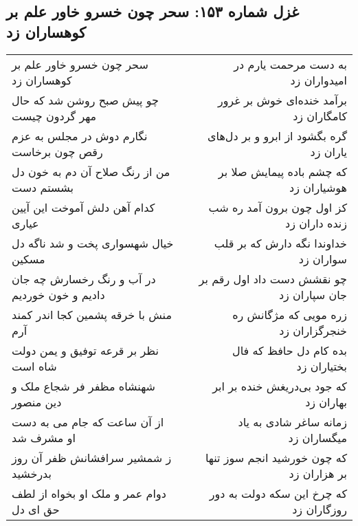\begin{center}
\section*{غزل شماره ۱۵۳: سحر چون خسرو خاور علم بر کوهساران زد}
\label{sec:sh153}
\begin{longtable}{l p{0.5cm} r}
سحر چون خسرو خاور علم بر کوهساران زد
&&
به دست مرحمت یارم در امیدواران زد
\\
چو پیش صبح روشن شد که حال مهر گردون چیست
&&
برآمد خنده‌ای خوش بر غرور کامگاران زد
\\
نگارم دوش در مجلس به عزم رقص چون برخاست
&&
گره بگشود از ابرو و بر دل‌های یاران زد
\\
من از رنگ صلاح آن دم به خون دل بشستم دست
&&
که چشم باده پیمایش صلا بر هوشیاران زد
\\
کدام آهن دلش آموخت این آیین عیاری
&&
کز اول چون برون آمد ره شب زنده داران زد
\\
خیال شهسواری پخت و شد ناگه دل مسکین
&&
خداوندا نگه دارش که بر قلب سواران زد
\\
در آب و رنگ رخسارش چه جان دادیم و خون خوردیم
&&
چو نقشش دست داد اول رقم بر جان سپاران زد
\\
منش با خرقه پشمین کجا اندر کمند آرم
&&
زره مویی که مژگانش ره خنجرگزاران زد
\\
نظر بر قرعه توفیق و یمن دولت شاه است
&&
بده کام دل حافظ که فال بختیاران زد
\\
شهنشاه مظفر فر شجاع ملک و دین منصور
&&
که جود بی‌دریغش خنده بر ابر بهاران زد
\\
از آن ساعت که جام می به دست او مشرف شد
&&
زمانه ساغر شادی به یاد میگساران زد
\\
ز شمشیر سرافشانش ظفر آن روز بدرخشید
&&
که چون خورشید انجم سوز تنها بر هزاران زد
\\
دوام عمر و ملک او بخواه از لطف حق ای دل
&&
که چرخ این سکه دولت به دور روزگاران زد
\\
\end{longtable}
\end{center}
